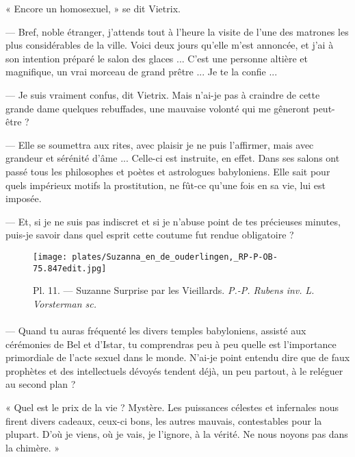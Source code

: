 \documentclass[a4paper, 11pt, oneside, polutonikogreek, french]{article}
\begin{document}
« Encore un homosexuel, » se dit Vietrix.

--- Bref, noble étranger, j'attends tout à l'heure la visite de l'une des matrones les plus considérables de la ville. Voici deux jours qu'elle m'est annoncée, et j'ai à son intention préparé le salon des glaces ... C'est une personne altière et magnifique, un vrai morceau de grand prêtre ... Je te la confie ...

--- Je suis vraiment confus, dit Vietrix. Mais n'ai-je pas à craindre de cette grande dame quelques rebuffades, une mauvaise volonté qui me gêneront peut-être ?

--- Elle se soumettra aux rites, avec plaisir je ne puis l'affirmer, mais avec grandeur et sérénité d'âme ... Celle-ci est instruite, en effet. Dans ses salons ont passé tous les philosophes et poètes et astrologues babyloniens. Elle sait pour quels impérieux motifs la prostitution, ne fût-ce qu'une fois en sa vie, lui est imposée.

--- Et, si je ne suis pas indiscret et si je n'abuse point de tes précieuses minutes, puis-je savoir dans quel esprit cette coutume fut rendue obligatoire ?

\bigskip
\centerline{\EightStarTaper}
\centerline{\EightStarTaper\EightStarTaper}
\bigskip
\clearpage
\vspace*{\fill}
\begin{figure}[H]
\centering
\texttt{[image: plates/Suzanna\_en\_de\_ouderlingen,\_RP-P-OB-75.847edit.jpg]}
\caption{Pl. 11. --- Suzanne Surprise par les Vieillards. \emph{P.-P. Rubens inv.} \emph{L. Vorsterman sc.}}
\end{figure}
\vspace*{\fill}
\clearpage
\paragraph{}
--- Quand tu auras fréquenté les divers temples babyloniens, assisté aux cérémonies de Bel et d'Istar, tu comprendras peu à peu quelle est l'importance primordiale de l'acte sexuel dans le monde. N'ai-je point entendu dire que de faux prophètes et des intellectuels dévoyés tendent déjà, un peu partout, à le reléguer au second plan ?

« Quel est le prix de la vie ? Mystère. Les puissances célestes et infernales nous firent divers cadeaux, ceux-ci bons, les autres mauvais, contestables pour la plupart. D'où je viens, où je vais, je l'ignore, à la vérité. Ne nous noyons pas dans la chimère. »
\end{document}
